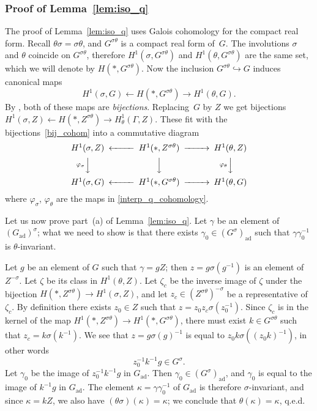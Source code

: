 \documentclass[10pt,leqno]{article}
\newcommand{\ad}{\mathrm{ad}}
\newcommand{\Gad}{G_\mathrm{ad}}
\begin{document}
\subsubsection{Proof of Lemma~\ref{lem:iso_q}}

The proof of Lemma~\ref{lem:iso_q} uses Galois cohomology for the compact real form.  Recall $\theta\sigma = \sigma\theta$, and $G^{\sigma\theta}$ is a compact real form of~$G$. 
The involutions $\sigma$ and $\theta$ coincide on $G^{\sigma\theta}$,
therefore  $H^1(\sigma, G^{\sigma\theta})$ and  $H^1(\theta, G^{\sigma\theta})$ are the same set,
which we will denote by  $H(\ast, G^{\sigma\theta})$.
Now the inclusion $G^{\sigma\theta} \hookrightarrow G$ induces canonical maps 
\begin{equation} \label{bij_cohom} H^{1}(\sigma,  G) \longleftarrow H(\ast, G^{\sigma\theta}) \longrightarrow H^{1}(\theta,  G).\end{equation}
By \cite[Corollary~4.4 and Corollary 4.7]{galois}, both of these maps are \emph{bijections}.
Replacing~$G$ by $Z$ we get bijections $H^{1}(\sigma, Z) \leftarrow H(\ast, Z^{\sigma\theta}) \rightarrow H^{1}_{\theta}(\Gamma, Z)$.
These fit with the bijections~\eqref{bij_cohom} into a commutative diagram
\[
\begin{CD}
H^{1}(\sigma, Z) @<<< H^1(\ast, Z^{\sigma\theta})@>>> H^{1}(\theta, Z)
 \\
@V{\varphi_{\sigma}}VV @VVV @V{\varphi_{\theta}}VV  \\
H^{1}(\sigma, G) @<<< H^1(\ast, G^{\sigma\theta})@>>> H^{1}(\theta,  G)
\end{CD}
\]
where $\varphi_\sigma$, $\varphi_\theta$ are the maps in \eqref{interp_q_cohomology}.

Let us now prove part~(a) of Lemma~\ref{lem:iso_q}. Let $\gamma$ be an element of $(\Gad)^\sigma$; what we need to show is that there exists $\gamma_0 \in (G^\sigma)_{\ad}$ such that $\gamma \gamma_0^{-1}$ is $\theta$-invariant. 

Let $g$ be an element of $G$ such that $\gamma = gZ$; then $z=g \sigma(g^{-1})$ is an element of $Z^{-\sigma}$. Let $\zeta$ be its class in $H^{1}(\theta, Z)$. Let $\zeta_c$ be the inverse image of $\zeta$ under the bijection $H(\ast, Z^{\sigma\theta})\to H^{1}(\sigma, Z) $, and let $z_c\in (Z^{\sigma\theta})^{-\sigma}$ be a representative of $\zeta_c$. By definition there exists $z_0 \in Z$ such that $z = z_0 z_c \sigma(z_0^{-1})$. Since $\zeta_c$ is in the kernel of the map $H^1(\ast, Z^{\sigma\theta}) \to H^1(\ast, G^{\sigma\theta})$, there must exist  $k \in G^{\sigma\theta}$  such that $z_c = k \sigma(k^{-1})$. We see that $z = g \sigma(g)^{-1}$ is equal to $z_0 k \sigma((z_0k)^{-1})$, in other words 
\[ z_0^{-1} k^{-1} g \in G^{\sigma}.\]
Let $\gamma_0$ be the image of $z_0^{-1} k^{-1} g$ in $\Gad$. Then $\gamma_0 \in (G^{\sigma})_\ad$, and $\gamma_0$ is equal to the image of $k^{-1} g$ in $\Gad$. The element $\kappa=\gamma \gamma_0^{-1}$ of $\Gad$  is therefore $\sigma$-invariant, and since $\kappa=kZ$, we also have $(\theta\sigma)(\kappa)=\kappa$; we conclude that $\theta(\kappa) = \kappa$, q.e.d. 
\end{document}
